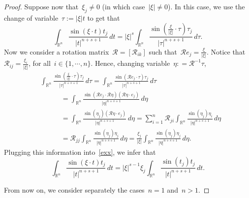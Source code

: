 \documentclass[11pt,hyp,]{nyjm}
\numberwithin{equation}{section}
\newcommand{\R}{\mathbb{R}}
\theoremstyle{remark}
\begin{document}
\begin{proof}
Suppose now that~$\xi_j \neq 0$ (in which case~$|\xi|\neq0$). In this case, we use the change of variable~$\tau:=|\xi|t $ to get that
\begin{equation}\label{exx}
\int_{\R^n} \frac{\sin(\xi \cdot t) t_j}{|t|^{n+s+1}} \, dt = |\xi|^{s} \int_{\R^n} \frac{\sin(\frac{\xi }{|\xi|}\cdot \tau) \tau_j}{|\tau|^{n+s+1}} \, d\tau
.\end{equation}
Now we consider a rotation matrix~$\mathcal{R}=[\mathcal{R}_{ik}]$ such that~$\mathcal{R} e_j= \frac{\xi}{|\xi|}$. Notice that~$\mathcal{R}_{ij}= \frac{\xi_i}{|\xi|}$, for all~$i\in\{1,\cdots,n\}$. Hence, 
changing variable~$\eta: = \mathcal{R}^{-1}\tau$,
\begin{equation*}\begin{split}
&\int_{\R^n} \frac{\sin(\frac{\xi }{|\xi|}\cdot \tau) \tau_j}{|\tau|^{n+s+1}} \, d\tau=
\int_{\R^n} \frac{\sin(\mathcal{R}e_j\cdot \tau) \tau_j}{|\tau|^{n+s+1}} \, d\tau \\&\qquad\quad
= \int_{\R^n} \frac{\sin(\mathcal{R}e_j\cdot \mathcal{R}\eta) 
\left(\mathcal{R}\eta \cdot e_j \right)}{|\eta|^{n+s+1}} \, d\eta \\ &\qquad\quad= \int_{\R^n} \frac{\sin(\eta_j) \left(\mathcal{R}\eta \cdot e_j \right)}{|\eta|^{n+s+1}} \, d\eta = \sum_{i=1}^n \mathcal{R}_{ji} \int_{\R^n} \frac{\sin(\eta_j) \eta_i}{|\eta|^{n+s+1}} \, d\eta  \\&\qquad\quad=\mathcal{R}_{jj} \int_{\R^n} \frac{\sin(\eta_j) \eta_j}{|\eta|^{n+s+1}} \, d\eta =  \frac{\xi_j}{|\xi|} \int_{\R^n} \frac{\sin(\eta_j) \eta_j}{|\eta|^{n+s+1}} \, d\eta.
\end{split}\end{equation*}
Plugging this information into~\eqref{exx}, we infer that
\begin{equation}\label{eqq}
\int_{\R^n} \frac{\sin(\xi \cdot t) t_j}{|t|^{n+s+1}} \, dt = |\xi|^{s-1}\xi_j \int_{\R^n} \frac{\sin(t_j) t_j}{|t|^{n+s+1}} \, dt.
\end{equation}

{F}rom now on, we consider separately the cases~$n=1$ and~$n>1$.


\end{proof}
\end{document}
